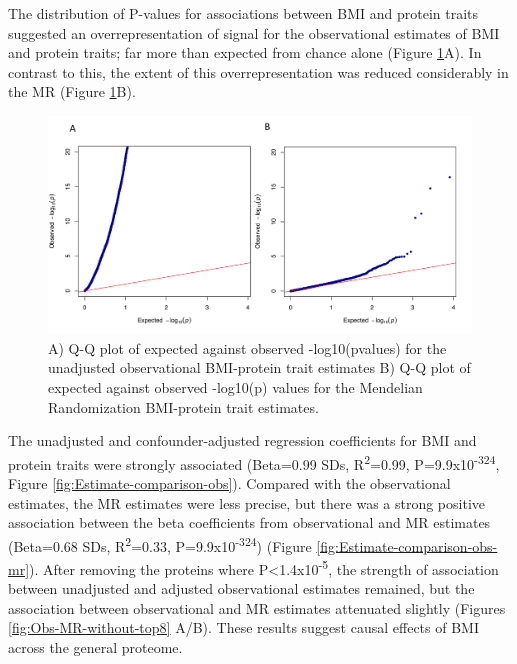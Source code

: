 \documentclass[11pt,twoside]{bristolthesis}
\begin{document}
The distribution of P-values for associations between BMI and protein traits suggested an overrepresentation of signal for the observational estimates of BMI and protein traits; far more than expected from chance alone (Figure \ref{fig:QQ-obs-MR}A). In contrast to this, the extent of this overrepresentation was reduced considerably in the MR (Figure \ref{fig:QQ-obs-MR}B).
\begin{figure}
\includegraphics[width=0.95\linewidth]{figure/BMI_protein_INTERVAL/QQ_obs_MR} \caption[Q-Q plot of the expected against observed -log10(pvalues) for BMI-protein estimates]{A) Q-Q plot of expected against observed -log10(pvalues) for the unadjusted observational BMI-protein trait estimates B) Q-Q plot of expected against observed -log10(p) values for the Mendelian Randomization BMI-protein trait estimates.}\label{fig:QQ-obs-MR}
\end{figure}
The unadjusted and confounder-adjusted regression coefficients for BMI and protein traits were strongly associated (Beta=0.99 SDs, R\textsuperscript{2}=0.99, P=9.9x10\textsuperscript{-324}, Figure \ref{fig:Estimate-comparison-obs}). Compared with the observational estimates, the MR estimates were less precise, but there was a strong positive association between the beta coefficients from observational and MR estimates (Beta=0.68 SDs, R\textsuperscript{2}=0.33, P=9.9x10\textsuperscript{-324}) (Figure \ref{fig:Estimate-comparison-obs-mr}). After removing the proteins where P\textless1.4x10\textsuperscript{-5}, the strength of association between unadjusted and adjusted observational estimates remained, but the association between observational and MR estimates attenuated slightly (Figures \ref{fig:Obs-MR-without-top8} A/B). These results suggest causal effects of BMI across the general proteome.
\end{document}
